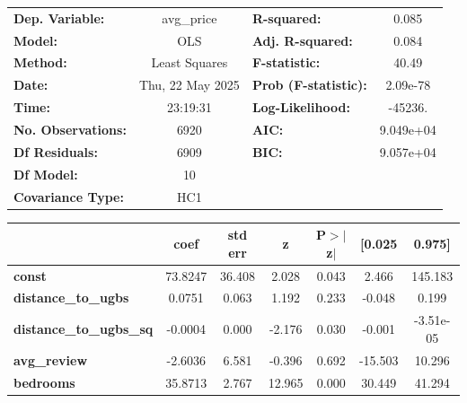 \begin{center}
\begin{tabular}{lclc}
\toprule
\textbf{Dep. Variable:}         &    avg\_price    & \textbf{  R-squared:         } &       0.085    \\
\textbf{Model:}                 &       OLS        & \textbf{  Adj. R-squared:    } &       0.084    \\
\textbf{Method:}                &  Least Squares   & \textbf{  F-statistic:       } &       40.49    \\
\textbf{Date:}                  & Thu, 22 May 2025 & \textbf{  Prob (F-statistic):} &    2.09e-78    \\
\textbf{Time:}                  &     23:19:31     & \textbf{  Log-Likelihood:    } &     -45236.    \\
\textbf{No. Observations:}      &        6920      & \textbf{  AIC:               } &   9.049e+04    \\
\textbf{Df Residuals:}          &        6909      & \textbf{  BIC:               } &   9.057e+04    \\
\textbf{Df Model:}              &          10      & \textbf{                     } &                \\
\textbf{Covariance Type:}       &       HC1        & \textbf{                     } &                \\
\bottomrule
\end{tabular}
\begin{tabular}{lcccccc}
                                & \textbf{coef} & \textbf{std err} & \textbf{z} & \textbf{P$> |$z$|$} & \textbf{[0.025} & \textbf{0.975]}  \\
\midrule
\textbf{const}                  &      73.8247  &       36.408     &     2.028  &         0.043        &        2.466    &      145.183     \\
\textbf{distance\_to\_ugbs}     &       0.0751  &        0.063     &     1.192  &         0.233        &       -0.048    &        0.199     \\
\textbf{distance\_to\_ugbs\_sq} &      -0.0004  &        0.000     &    -2.176  &         0.030        &       -0.001    &    -3.51e-05     \\
\textbf{avg\_review}            &      -2.6036  &        6.581     &    -0.396  &         0.692        &      -15.503    &       10.296     \\
\textbf{bedrooms}               &      35.8713  &        2.767     &    12.965  &         0.000        &       30.449    &       41.294     \\

\end{tabular}
\end{center}
